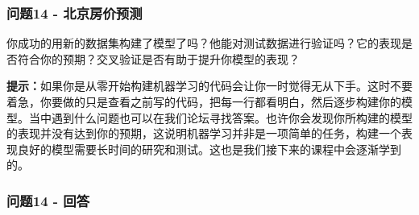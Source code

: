 \documentclass[11pt]{article}
\begin{document}
    \subsubsection{问题14 -
北京房价预测}\label{ux95eeux989814---ux5317ux4eacux623fux4ef7ux9884ux6d4b}

你成功的用新的数据集构建了模型了吗？他能对测试数据进行验证吗？它的表现是否符合你的预期？交叉验证是否有助于提升你模型的表现？

\textbf{提示：}如果你是从零开始构建机器学习的代码会让你一时觉得无从下手。这时不要着急，你要做的只是查看之前写的代码，把每一行都看明白，然后逐步构建你的模型。当中遇到什么问题也可以在我们论坛寻找答案。也许你会发现你所构建的模型的表现并没有达到你的预期，这说明机器学习并非是一项简单的任务，构建一个表现良好的模型需要长时间的研究和测试。这也是我们接下来的课程中会逐渐学到的。

    \subsubsection{问题14 - 回答}\label{ux95eeux989814---ux56deux7b54}


    
    
    
    
\end{document}
